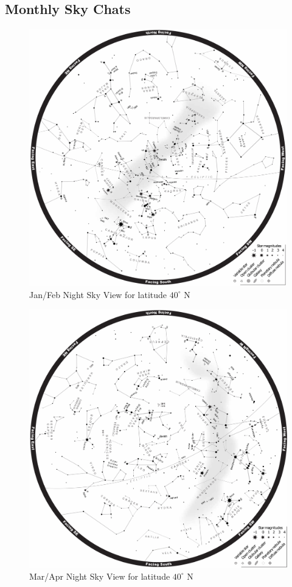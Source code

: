 \documentclass[a4paper,12pt]{extarticle}
\begin{document}
\subsection{Monthly Sky Chats}

\begin{figure}[H]
    \centering
    \includegraphics[width=0.9 \linewidth]{jan-feb.png}
    \caption{Jan/Feb Night Sky View for latitude $40^\circ$ N}
\end{figure}
\clearpage
\begin{figure}
    \centering
    \includegraphics[width=0.9 \linewidth]{mar-apr.png}
    \caption{Mar/Apr Night Sky View for latitude $40^\circ$ N}
\end{figure}
\end{document}
